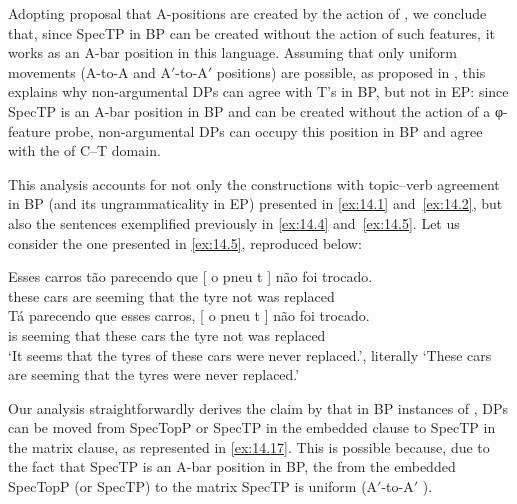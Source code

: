 \documentclass[output=paper]{langsci/langscibook}
\begin{document}
Adopting  proposal that A-positions are created by the
action of , we conclude that, since SpecTP in \gls{BP} can be
created without the action of such features, it works as an A-bar position in
this language. Assuming that only uniform movements (A-to-A and A$'$-to-A$'$
positions) are possible, as proposed in \citet{Chomsky2008}, this explains why
non-argumental DPs can agree with T’s  in BP, but not in EP: since
SpecTP is an A-bar position in \gls{BP} and can be created without the action
of a φ-feature probe, non-argumental DPs can occupy this position in \gls{BP}
and agree with the  of C--T domain.

This analysis accounts for not only the constructions with topic--verb
agreement in \gls{BP} (and its ungrammaticality in EP) presented in
\eqref{ex:14.1} and~\eqref{ex:14.2}, but also the 
sentences exemplified previously in \eqref{ex:14.4}
and~\eqref{ex:14.5}. Let us consider the one presented in
\eqref{ex:14.5}, reproduced below:

\ea\label{ex:14.16}
    \ea
	\gll    Esses carros tão parecendo que [ o pneu t ] não foi trocado.\\
    these cars are seeming that {} the tyre {} {} not was replaced\\
    \ex
    \gll    Tá parecendo que esses carros, [ o pneu t ] não foi trocado.\\
    is seeming that these cars {} the tyre {} {} not was replaced\\
    \glt    ‘It seems that the tyres of these cars were never replaced.’,
            literally ‘These cars are seeming that the tyres were never replaced.’
    \z
\z

\begin{sloppypar}
Our analysis straightforwardly derives the claim by \citet{MartinsNunes2010}
that in \gls{BP} instances of , DPs can be moved from SpecTopP
or SpecTP in the embedded clause to SpecTP in the matrix clause, as
represented in \eqref{ex:14.17}. This is possible because, due to the fact that
SpecTP is an A-bar position in BP, the  from the embedded SpecTopP
(or SpecTP) to the matrix SpecTP is uniform (A$'$-to-A$'$ ).
\end{sloppypar}
\end{document}
